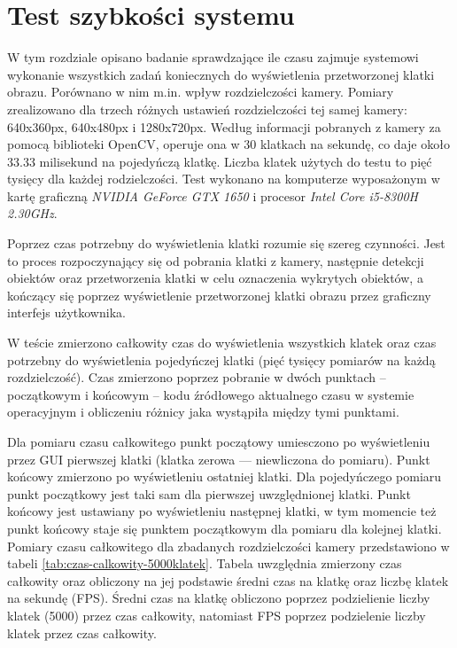 \chapter{Test szybkości systemu}
W tym rozdziale opisano badanie sprawdzające ile czasu zajmuje systemowi wykonanie wszystkich zadań koniecznych do wyświetlenia przetworzonej klatki obrazu. Porównano w nim m.in. wpływ rozdzielczości kamery. Pomiary zrealizowano dla trzech różnych ustawień rozdzielczości tej samej kamery: 640x360px, 640x480px i 1280x720px.
Według informacji pobranych z kamery za pomocą biblioteki OpenCV, operuje ona w 30 klatkach na sekundę, co daje około 33.33 milisekund na pojedyńczą klatkę. Liczba klatek użytych do testu to pięć tysięcy dla każdej rodzielczości.
Test wykonano na komputerze wyposażonym w kartę graficzną \emph{NVIDIA GeForce GTX 1650} i procesor \emph{Intel Core i5-8300H 2.30GHz}.

Poprzez czas potrzebny do wyświetlenia klatki rozumie się szereg czynności. Jest to proces rozpoczynający się od pobrania klatki z kamery, następnie detekcji obiektów oraz przetworzenia klatki w celu oznaczenia wykrytych obiektów, a kończący się poprzez wyświetlenie przetworzonej klatki obrazu przez graficzny interfejs użytkownika. 

W teście zmierzono całkowity czas do wyświetlenia wszystkich klatek oraz czas potrzebny do wyświetlenia pojedyńczej klatki (pięć tysięcy pomiarów na każdą rozdzielczość). Czas zmierzono poprzez pobranie w dwóch punktach -- początkowym i końcowym -- kodu źródłowego aktualnego czasu w systemie operacyjnym i obliczeniu różnicy jaka wystąpiła między tymi punktami. 

Dla pomiaru czasu całkowitego punkt początowy umiesczono po wyświetleniu przez GUI pierwszej klatki (klatka zerowa --- niewliczona do pomiaru). Punkt końcowy zmierzono po wyświetleniu ostatniej klatki.
Dla pojedyńczego pomiaru punkt początkowy jest taki sam dla pierwszej uwzględnionej klatki. Punkt końcowy jest ustawiany po wyświetleniu następnej klatki, w tym momencie też punkt końcowy staje się punktem początkowym dla pomiaru dla kolejnej klatki.
Pomiary czasu całkowitego dla zbadanych rozdzielczości kamery przedstawiono w tabeli \ref{tab:czas-calkowity-5000klatek}. Tabela uwzględnia zmierzony czas całkowity oraz obliczony na jej podstawie średni czas na klatkę oraz liczbę klatek na sekundę (FPS). Średni czas na klatkę obliczono poprzez podzielienie liczby klatek (5000) przez czas całkowity, natomiast FPS poprzez podzielenie liczby klatek przez czas całkowity.  


